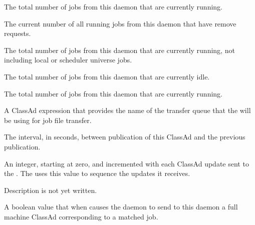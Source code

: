 \begin{description}
\item[\AdAttr{TotalLocalRunningJobs}:] The total number of 
    jobs from this
   daemon that are currently running.

\item[\AdAttr{TotalRemovedJobs}:] The current number of all running jobs
  from this  daemon that have remove requests.

\item[\AdAttr{TotalRunningJobs}:] The total number of jobs from this
   daemon that are currently running, not including
  local or scheduler universe jobs.

\item[\AdAttr{TotalSchedulerIdleJobs}:] The total number of 
    jobs from this
   daemon that are currently idle.

\item[\AdAttr{TotalSchedulerRunningJobs}:] The total number of 
    jobs from this
   daemon that are currently running.

\item[\AdAttr{TransferQueueUserExpr}]
  A ClassAd expression that provides the name of the transfer queue
  that the  will be using for job file transfer.

\item[\AdAttr{UpdateInterval}:] The interval, in seconds,
  between publication of this  ClassAd and
  the previous publication.

\item[\AdAttr{UpdateSequenceNumber}:] An integer, starting at zero,
  and incremented with each ClassAd update sent to the .
  The  uses this value to sequence the updates it
  receives.

\item[\AdAttr{VirtualMemory}:] Description is not yet written.

\item[\AdAttr{WantResAd}:] A boolean value that when 
  causes the  daemon to send to this 
  daemon a full machine ClassAd corresponding to a matched job.

\end{description}


